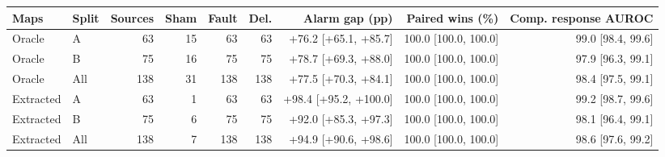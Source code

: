 \begin{tabular}{@{}llrrrrrrr@{}}
\toprule
Maps & Split & Sources & Sham & Fault & Del. & Alarm gap (pp) & Paired wins (\%) & Comp. response AUROC \\
\midrule
Oracle & A & 63 & 15 & 63 & 63 & +76.2 [+65.1, +85.7] & 100.0 [100.0, 100.0] & 99.0 [98.4, 99.6] \\
Oracle & B & 75 & 16 & 75 & 75 & +78.7 [+69.3, +88.0] & 100.0 [100.0, 100.0] & 97.9 [96.3, 99.1] \\
Oracle & All & 138 & 31 & 138 & 138 & +77.5 [+70.3, +84.1] & 100.0 [100.0, 100.0] & 98.4 [97.5, 99.1] \\
\midrule
Extracted & A & 63 & 1 & 63 & 63 & +98.4 [+95.2, +100.0] & 100.0 [100.0, 100.0] & 99.2 [98.7, 99.6] \\
Extracted & B & 75 & 6 & 75 & 75 & +92.0 [+85.3, +97.3] & 100.0 [100.0, 100.0] & 98.1 [96.4, 99.1] \\
Extracted & All & 138 & 7 & 138 & 138 & +94.9 [+90.6, +98.6] & 100.0 [100.0, 100.0] & 98.6 [97.6, 99.2] \\
\bottomrule
\end{tabular}
